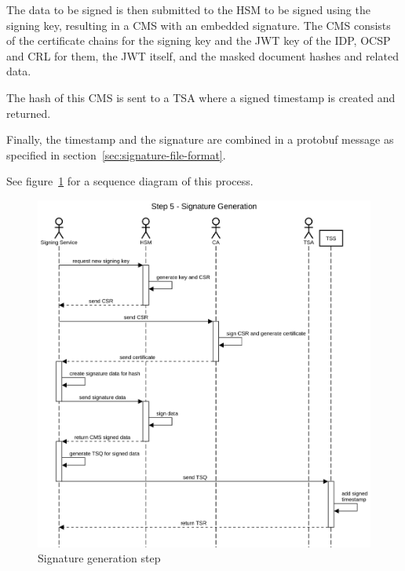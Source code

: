 The data to be signed is then submitted to the \gls{HSM} to be signed using the signing key,
resulting in a \gls{CMS} with an embedded signature.
The \gls{CMS} consists of the certificate chains for the signing key and the \gls{JWT} key  of the \gls{IDP},
\gls{OCSP} and \gls{CRL} for them,
the \gls{JWT} itself,
and the masked document hashes and related data.

The hash of this \gls{CMS} is sent to a \gls{TSA} where a signed timestamp is created and returned.

Finally, the timestamp and the signature are combined in a protobuf message as specified in section~\ref{sec:signature-file-format}.

See figure~\ref{fig:signaturegenerationstep} for a sequence diagram of this process.

\begin{figure}[H]
    \begin{center}
        \includegraphics[scale=0.45]{images/protocol_step5_signature_generation.png}
        \caption{Signature generation step}
        \label{fig:signaturegenerationstep}
    \end{center}
\end{figure}

\pagebreak

